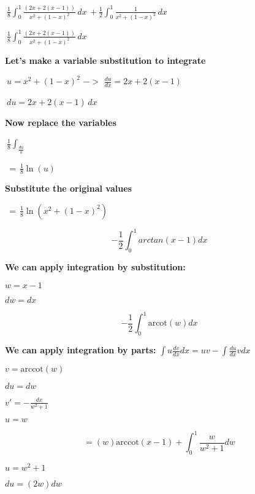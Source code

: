 \documentclass{article}
\begin{document}
\bigskip $\ \frac{1}{8} \int_{0}^{1} \frac{(2x+2(x-1))}{x^2+(1-x)^2}\,dx\, + \frac{1}{2} \int_{0}^{1}\frac{1}{x^2+(1-x)^2} \,dx \,$\ 

\bigskip

\bigskip $\ \frac{1}{8} \int_{0}^{1} \frac{(2x+2(x-1))}{x^2+(1-x)^2}\,dx\,$\ 

\bigskip \textbf{Let's make a variable substitution to integrate} 

\bigskip $\ u=x^2+(1-x)^2 \,\,->\,\, \frac {du}{dx}= 2x+2(x-1) \,\,$\ 

\bigskip $\ du=2x+2(x-1) \,dx\,$\

\bigskip \textbf{Now replace the variables} 

\bigskip $\ \frac{1}{8} \int_ \frac {du}{u} $\

\bigskip $\ = \, \frac{1}{8} \ln (u) $\

\bigskip \textbf{Substitute the original values}

\bigskip $\ = \, \frac{1}{8} \ln (x^2+(1-x)^2)  $


\begin{equation*}
   -\frac{1}{2}\int_{0}^{1} arctan(x-1)dx
\end{equation*}

\bigskip\textbf{We can apply integration by substitution:}
\begin{list}{}{}
       \item $w=x-1$  
       \item $dw=dx$
\end{list}

\begin{equation*}
   -\frac{1}{2}\int_{0}^{1}\textrm{arcot}(w)dx
\end{equation*}

\bigskip\textbf{We can apply integration by parts:} $\int {u\frac{{dv}}{{dx}}} dx = uv - \int {\frac{{du}}{{dx}}} vdx$ 
\begin{list}{}{}
       \item $v=\textrm{arccot}(w)$
       \item $du = dw$
       \item $v'=-\frac{dx}{w^2+1}
$
       \item $u=w$
\end{list}

\begin{equation*}
   =(w)\textrm{arccot}(x-1)+\int_{0}^{1}\frac{w}{w^2+1}dw
\end{equation*}
\begin{list}{}{}
       \item $u=w^2+1$
       \item $du=(2w)dw$
\end{list}
\end{document}
